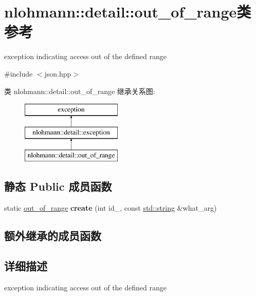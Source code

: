 \hypertarget{classnlohmann_1_1detail_1_1out__of__range}{}\section{nlohmann\+::detail\+::out\+\_\+of\+\_\+range类 参考}
\label{classnlohmann_1_1detail_1_1out__of__range}


exception indicating access out of the defined range  




{\ttfamily \#include $<$json.\+hpp$>$}

类 nlohmann\+::detail\+::out\+\_\+of\+\_\+range 继承关系图\+:\begin{figure}[H]
\begin{center}
\leavevmode
\includegraphics[height=3.000000cm]{classnlohmann_1_1detail_1_1out__of__range}
\end{center}
\end{figure}
\subsection*{静态 Public 成员函数}
\begin{DoxyCompactItemize}
\item 
\mbox{\label{classnlohmann_1_1detail_1_1out__of__range_a3f6d82a6f967c4728a1ec735a7867073}} 
static \mbox{\hyperlink{classnlohmann_1_1detail_1_1out__of__range}{out\+\_\+of\+\_\+range}} {\bfseries create} (int id\+\_\+, const \mbox{\hyperlink{namespacenlohmann_1_1detail_a1ed8fc6239da25abcaf681d30ace4985ab45cffe084dd3d20d928bee85e7b0f21}{std\+::string}} \&what\+\_\+arg)
\end{DoxyCompactItemize}
\subsection*{额外继承的成员函数}


\subsection{详细描述}
exception indicating access out of the defined range 

